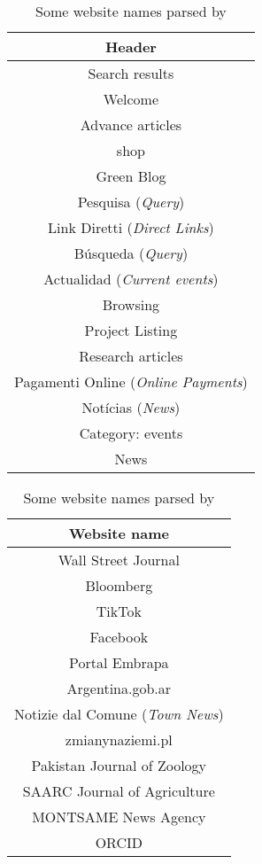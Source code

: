 
\begin{table}[ht]
\centering
\begin{minipage}{0.45\linewidth}
\centering
\begin{tabular}{|c|}
\hline
\textbf{Header} \\ \hline
Search results \\
Welcome \\
Advance articles \\
shop \\
Green Blog \\
Pesquisa (\textit{Query})\\
Link Diretti (\textit{Direct Links})\\
Búsqueda (\textit{Query})\\
Actualidad (\textit{Current events})\\
Browsing \\
Project Listing \\
Research articles \\
Pagamenti Online (\textit{Online Payments})\\
Notícias (\textit{News})\\
Category: events \\
News \\
\hline
\end{tabular}
\caption{Some headers parsed by \trafilatura{} }
\label{tab:04_headers}
\end{minipage}
\hfill
\begin{minipage}{0.45\linewidth}
\centering
\begin{tabular}{|c|}
\hline
\textbf{Website name} \\ \hline
Wall Street Journal \\
Bloomberg \\
TikTok \\
Facebook \\
Portal Embrapa \\
Argentina.gob.ar \\
Notizie dal Comune (\textit{Town News}) \\
zmianynaziemi.pl \\
Pakistan Journal of Zoology \\
SAARC Journal of Agriculture \\
MONTSAME News Agency \\
ORCID \\
\hline
\end{tabular}
\caption{Some website names parsed by \trafilatura{} }
\label{tab:04_website_names}
\end{minipage}
\end{table}
